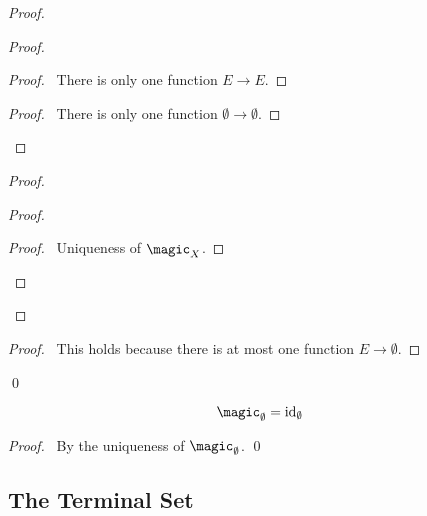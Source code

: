 \begin{proof}
  \pf
  \begin{proof}
    \begin{proof}
      \pf\ There is only one function $E \rightarrow E$.
    \end{proof}
    \begin{proof}
      \pf\ There is only one function $\emptyset \rightarrow \emptyset$.
    \end{proof}
  \end{proof}
  \begin{proof}
    \begin{proof}
      \begin{proof}
        \pf\ Uniqueness of $\magic_X$.
      \end{proof}
      \qedstep
    \end{proof}
  \end{proof}
  \begin{proof}
    \pf\ This holds because there is at most one function $E \rightarrow \emptyset$.
  \end{proof}
  \qed
\end{proof}

\begin{prop}
  \[ \magic_\emptyset = \id{\emptyset} \]
\end{prop}

\begin{proof}
  \pf\ By the uniqueness of $\magic_\emptyset$. \qed
\end{proof}

\subsection{The Terminal Set}

